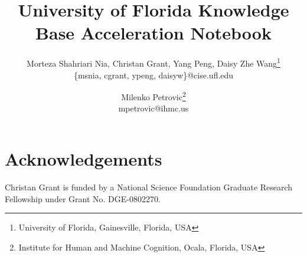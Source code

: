 \documentclass[letterpaper]{article}
\begin{document}
\title{University of Florida Knowledge Base Acceleration Notebook}





\author{Morteza Shahriari Nia, Christan Grant, Yang Peng, Daisy Zhe Wang\footnote{University of Florida, Gainesville, Florida, USA}\\
       {\{msnia, cgrant, ypeng, daisyw\}@cise.ufl.edu}
\and
  Milenko Petrovic\footnote{Institute for Human and Machine Cognition, Ocala, Florida, USA}\\
       {mpetrovic@ihmc.us}
}

\maketitle















\section*{Acknowledgements}
Christan Grant is funded by a National Science Foundation Graduate Research
Fellowship under Grant No. DGE-0802270. 

%
%





\end{document}
